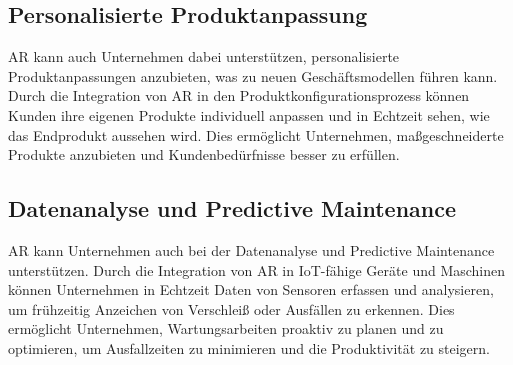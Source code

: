 \subsection{Personalisierte Produktanpassung}
AR kann auch Unternehmen dabei unterstützen, personalisierte Produktanpassungen
anzubieten, was zu neuen Geschäftsmodellen führen kann. Durch die Integration
von AR in den Produktkonfigurationsprozess können Kunden ihre eigenen Produkte
individuell anpassen und in Echtzeit sehen, wie das Endprodukt aussehen wird.
Dies ermöglicht Unternehmen, maßgeschneiderte Produkte anzubieten und
Kundenbedürfnisse besser zu erfüllen.

\subsection{Datenanalyse und Predictive Maintenance}
AR kann Unternehmen auch bei der Datenanalyse und Predictive Maintenance
unterstützen. Durch die Integration von AR in IoT-fähige Geräte und Maschinen
können Unternehmen in Echtzeit Daten von Sensoren erfassen und analysieren, um
frühzeitig Anzeichen von Verschleiß oder Ausfällen zu erkennen. Dies ermöglicht
Unternehmen, Wartungsarbeiten proaktiv zu planen und zu optimieren, um
Ausfallzeiten zu minimieren und die Produktivität zu steigern.